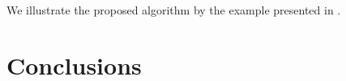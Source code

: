 \documentclass[twocolumn,amsthm]{autart}%
\theoremstyle{definition}
\theoremstyle{plain}
\begin{document}
We illustrate the proposed algorithm by the example presented in \cite{le2024distributed}.

\section{Conclusions}


\begin{comment}
\section{Optimization Algorithm}

We need to develop an optimization algorithm to efficiently solve not in centralized manner.
Two approaches have been found in the literature:

\begin{itemize}
\item Distributed optimization: \cite{huang2023decentralized}.
\item Sequential computation with priority assignment: \cite{katriniok2022fully}, \cite{scheffe2023reducing}.
\end{itemize}

Let assume that the TLC units keep the trajectory prediction of HDVs on each lane.

\section{Prediction Model for HDVs}

\Note{Will start doing simulation with constant acceleration model first.}


\begin{itemize}
\item The human driving behavior may follow different modes (\eg car-following, constant velocity, or constant acceleration), and the human control policy in each mode is parameterized by parameters (\eg car-following model's parameters) that describe different human driving styles.




\end{comment}
\end{document}
